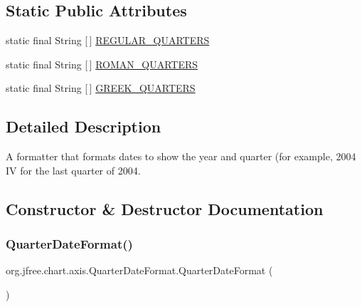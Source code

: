 \subsection*{Static Public Attributes}
\begin{DoxyCompactItemize}
\item 
static final String \mbox{[}$\,$\mbox{]} \mbox{\hyperlink{classorg_1_1jfree_1_1chart_1_1axis_1_1_quarter_date_format_a70800e16a89fcc8ec938985b372a8994}{R\+E\+G\+U\+L\+A\+R\+\_\+\+Q\+U\+A\+R\+T\+E\+RS}}
\item 
static final String \mbox{[}$\,$\mbox{]} \mbox{\hyperlink{classorg_1_1jfree_1_1chart_1_1axis_1_1_quarter_date_format_aae25f55d177a4f7be65d5f261ae5f23a}{R\+O\+M\+A\+N\+\_\+\+Q\+U\+A\+R\+T\+E\+RS}}
\item 
static final String \mbox{[}$\,$\mbox{]} \mbox{\hyperlink{classorg_1_1jfree_1_1chart_1_1axis_1_1_quarter_date_format_a35ee90809e7468b2f8913afdd2e9acc6}{G\+R\+E\+E\+K\+\_\+\+Q\+U\+A\+R\+T\+E\+RS}}
\end{DoxyCompactItemize}


\subsection{Detailed Description}
A formatter that formats dates to show the year and quarter (for example, \textquotesingle{}2004 IV\textquotesingle{} for the last quarter of 2004. 

\subsection{Constructor \& Destructor Documentation}
\mbox{\label{classorg_1_1jfree_1_1chart_1_1axis_1_1_quarter_date_format_aa8bbdd4434c00d4601fe2ea69de7c5a1}} 
\subsubsection{\texorpdfstring{Quarter\+Date\+Format()}{QuarterDateFormat()}\hspace{0.1cm}{\footnotesize\ttfamily [1/4]}}
{\footnotesize\ttfamily org.\+jfree.\+chart.\+axis.\+Quarter\+Date\+Format.\+Quarter\+Date\+Format (\begin{DoxyParamCaption}{ }\end{DoxyParamCaption})}

